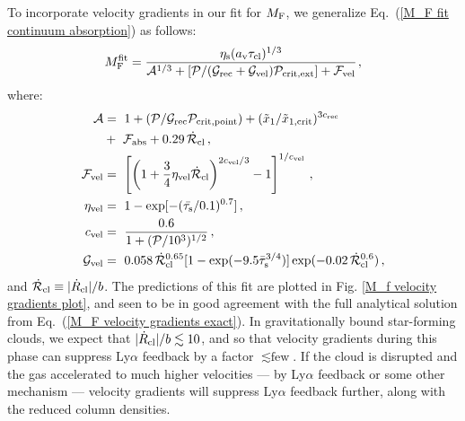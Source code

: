 \documentclass[fleqn,usenatbib]{mnras}
\newcommand{\taucl}{\tau_{\rm cl}}
\newcommand\HI{\ion{H}{I}\xspace} %
\begin{document}
To incorporate velocity gradients in our fit for $M_{\rm F}$, we generalize Eq.~(\ref{M_F fit continuum absorption}) as follows:
\begin{equation}
    M_{\rm F}^{\rm fit} =  \dfrac{\eta_{\rm s} (a_{\rm v}\taucl)^{1/3}}{\mathcal{A}^{1/3} + [\mathcal{P}/(\mathcal{G}_{\rm rec} + \mathcal{G}_{\rm vel})\mathcal{P}_{\rm crit,ext}] + \mathcal{F}_{\rm vel}} \hspace{1 pt} , \label{M_F fit velocity}
\end{equation}
where:
\begin{align}
    \mathcal{A} &=~ 1 + ( \mathcal{P}/\mathcal{G}_{\rm rec}\mathcal{P}_{\rm crit,point}) + (\Tilde{x}_1/\Tilde{x}_{\rm 1,crit})^{3c_{\rm rec}} \\ &+~ \mathcal{F}_{\rm abs} + 0.29 \, \Dot{\mathcal{R}}_{\rm cl} \, , \nonumber \\
    \mathcal{F}_{\rm vel} &=~ \left[\left(1 + \dfrac{3}{4} \eta_{\rm vel} \Dot{\mathcal{R}}_{\rm cl} \right)^{2c_{\rm vel}/3} - 1 \right]^{1/c_{\rm vel}} \, , \\
    \eta_{\rm vel} &=~ 1 - \exp[ - (\Bar{\tau_{\rm s}}/0.1)^{0.7}] \, , \\ c_{\rm vel} &=~ \dfrac{0.6}{1 + (\mathcal{P}/10^3)^{1/2}} \, , \\
    \mathcal{G}_{\rm vel} &=~ 0.058 \, \Dot{\mathcal{R}}_{\rm cl}^{0.65} [1 - \exp(- 9.5\Bar{\tau}_{\rm s}^{3/4})] \exp(- 0.02 \, \Dot{\mathcal{R}}_{\rm cl}^{0.6}) \, ,
\end{align}
and $\Dot{\mathcal{R}}_{\rm cl} \equiv \lvert \Dot{R}_{\rm cl} \rvert/b$. The predictions of this fit are plotted in Fig. \ref{M_f velocity gradients plot}, and seen to be in good agreement with the full analytical solution from Eq.~(\ref{M_F velocity gradients exact}). In gravitationally bound star-forming clouds, we expect that $\lvert \Dot{R}_{\rm cl} \rvert/b \lesssim 10$, and so that velocity gradients during this phase can suppress Ly$\alpha$ feedback by a factor $\lesssim \textrm{few}$. If the cloud is disrupted and the gas accelerated to much higher velocities --- by Ly$\alpha$ feedback or some other mechanism --- velocity gradients will suppress Ly$\alpha$ feedback further, along with the reduced \HI column densities.
\end{document}
